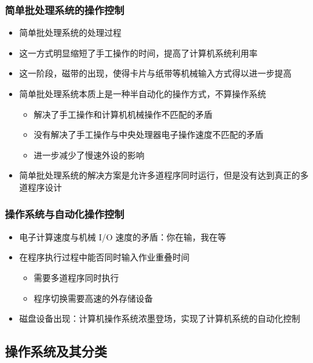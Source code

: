 \documentclass[cs4size,a4paper,10pt]{ctexart}
\begin{document}
	\subsubsection{简单批处理系统的操作控制}
	\begin{itemize}
		\item 简单批处理系统的处理过程
		\item 这一方式明显缩短了手工操作的时间，提高了计算机系统利用率
		\item 这一阶段，磁带的出现，使得卡片与纸带等机械输入方式得以进一步提高
		\item 简单批处理系统本质上是一种半自动化的操作方式，不算操作系统
		\begin{itemize}
			\item 解决了手工操作和计算机机械操作不匹配的矛盾
			\item 没有解决了手工操作与中央处理器电子操作速度不匹配的矛盾
			\item 进一步减少了慢速外设的影响
		\end{itemize}
		\item 简单批处理系统的解决方案是允许多道程序同时运行，但是没有达到真正的多道程序设计
	\end{itemize}


	\subsubsection{操作系统与自动化操作控制}
	\begin{itemize}
		\item 电子计算速度与机械 I/O 速度的矛盾：你在输，我在等
		\item 在程序执行过程中能否同时输入作业重叠时间
		\begin{itemize}
			\item 需要多道程序同时执行
			\item 程序切换需要高速的外存储设备
		\end{itemize}
		\item 磁盘设备出现：计算机操作系统浓墨登场，实现了计算机系统的自动化控制
	\end{itemize}


	\subsection{操作系统及其分类}
\end{document}
